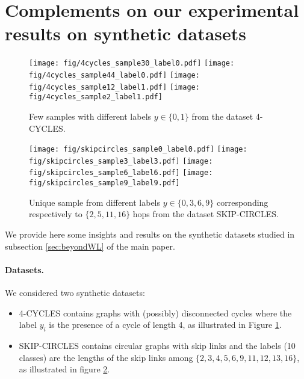 \documentclass{article}
\begin{document}
{\section{Complements on our experimental results on synthetic datasets}
\begin{figure}[H] 
	\begin{center}
		\texttt{[image: fig/4cycles\_sample30\_label0.pdf]} \hfill
		\texttt{[image: fig/4cycles\_sample44\_label0.pdf]}\hfill
		\texttt{[image: fig/4cycles\_sample12\_label1.pdf]}\hfill
		\texttt{[image: fig/4cycles\_sample2\_label1.pdf]}
	\end{center}
	\caption{\label{fig:4cycles_samples}Few samples with different labels $y \in \{0,1\}$ from the dataset 4-CYCLES.}
\end{figure}
\begin{figure}[H] 
	\begin{center}
		\texttt{[image: fig/skipcircles\_sample0\_label0.pdf]} \hfill
		\texttt{[image: fig/skipcircles\_sample3\_label3.pdf]} \hfill
		\texttt{[image: fig/skipcircles\_sample6\_label6.pdf]} \hfill
		\texttt{[image: fig/skipcircles\_sample9\_label9.pdf]} \hfill
	\end{center}
	\caption{\label{fig:skipcircles_samples}Unique sample from different labels $y \in \{0,3,6,9\}$ corresponding respectively to $\{2,5,11,16\}$ hops from the dataset SKIP-CIRCLES.}
\end{figure}
We provide here some insights and results on the synthetic datasets studied in subsection \ref{sec:beyondWL} of the main paper.
\paragraph{Datasets.} 
We considered two synthetic datasets:
\begin{itemize}
	\item 4-CYCLES \cite{loukas2019graph, papp2021dropgnn} contains graphs with (possibly) disconnected cycles where the label $y_i$ is the presence of a cycle of length 4, as illustrated in Figure \ref{fig:4cycles_samples}.
\end{itemize}
\begin{itemize}
	\item 
	SKIP-CIRCLES \cite{chen2019equivalence} contains circular graphs with skip links and the labels (10 classes) are the lengths of the skip links among $\{2, 3, 4, 5, 6, 9, 11, 12, 13, 16\}$, as illustrated in figure \ref{fig:skipcircles_samples}.
\end{itemize}

}
\end{document}

